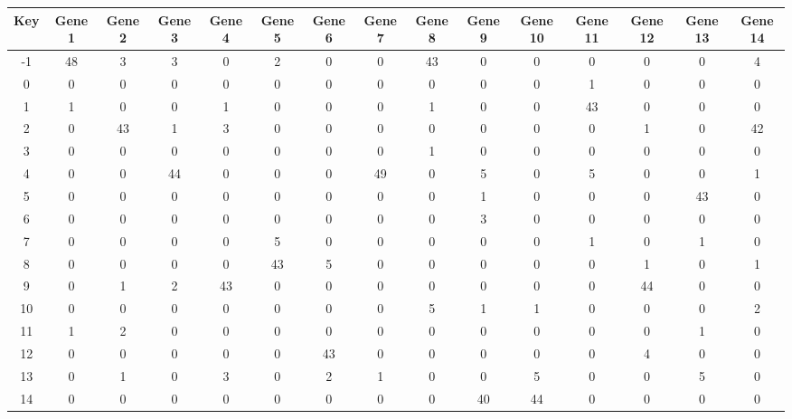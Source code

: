 \begin{tabular}{|c|c|c|c|c|c|c|c|c|c|c|c|c|c|c|}
\hline
Key & Gene 1 & Gene 2 & Gene 3 & Gene 4 & Gene 5 & Gene 6 & Gene 7 & Gene 8 & Gene 9 & Gene 10 & Gene 11 & Gene 12 & Gene 13 & Gene 14 \\
\hline
-1 & 48 & 3 & 3 & 0 & 2 & 0 & 0 & 43 & 0 & 0 & 0 & 0 & 0 & 4 \\
0 & 0 & 0 & 0 & 0 & 0 & 0 & 0 & 0 & 0 & 0 & 1 & 0 & 0 & 0 \\
1 & 1 & 0 & 0 & 1 & 0 & 0 & 0 & 1 & 0 & 0 & 43 & 0 & 0 & 0 \\
2 & 0 & 43 & 1 & 3 & 0 & 0 & 0 & 0 & 0 & 0 & 0 & 1 & 0 & 42 \\
3 & 0 & 0 & 0 & 0 & 0 & 0 & 0 & 1 & 0 & 0 & 0 & 0 & 0 & 0 \\
4 & 0 & 0 & 44 & 0 & 0 & 0 & 49 & 0 & 5 & 0 & 5 & 0 & 0 & 1 \\
5 & 0 & 0 & 0 & 0 & 0 & 0 & 0 & 0 & 1 & 0 & 0 & 0 & 43 & 0 \\
6 & 0 & 0 & 0 & 0 & 0 & 0 & 0 & 0 & 3 & 0 & 0 & 0 & 0 & 0 \\
7 & 0 & 0 & 0 & 0 & 5 & 0 & 0 & 0 & 0 & 0 & 1 & 0 & 1 & 0 \\
8 & 0 & 0 & 0 & 0 & 43 & 5 & 0 & 0 & 0 & 0 & 0 & 1 & 0 & 1 \\
9 & 0 & 1 & 2 & 43 & 0 & 0 & 0 & 0 & 0 & 0 & 0 & 44 & 0 & 0 \\
10 & 0 & 0 & 0 & 0 & 0 & 0 & 0 & 5 & 1 & 1 & 0 & 0 & 0 & 2 \\
11 & 1 & 2 & 0 & 0 & 0 & 0 & 0 & 0 & 0 & 0 & 0 & 0 & 1 & 0 \\
12 & 0 & 0 & 0 & 0 & 0 & 43 & 0 & 0 & 0 & 0 & 0 & 4 & 0 & 0 \\
13 & 0 & 1 & 0 & 3 & 0 & 2 & 1 & 0 & 0 & 5 & 0 & 0 & 5 & 0 \\
14 & 0 & 0 & 0 & 0 & 0 & 0 & 0 & 0 & 40 & 44 & 0 & 0 & 0 & 0 \\
\hline
\end{tabular}